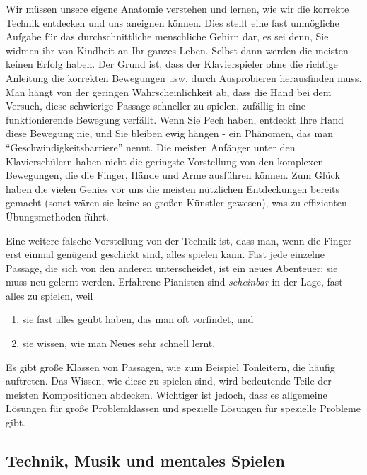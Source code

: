 Wir müssen unsere eigene Anatomie verstehen und lernen, wie wir die korrekte Technik entdecken und uns aneignen können.
Dies stellt eine fast unmögliche Aufgabe für das durchschnittliche menschliche Gehirn dar, es sei denn, Sie widmen ihr von Kindheit an Ihr ganzes Leben.
Selbst dann werden die meisten keinen Erfolg haben.
Der Grund ist, dass der Klavierspieler ohne die richtige Anleitung die korrekten Bewegungen usw. durch Ausprobieren herausfinden muss.
Man hängt von der geringen Wahrscheinlichkeit ab, dass die Hand bei dem Versuch, diese schwierige Passage schneller zu spielen, zufällig in eine funktionierende Bewegung verfällt.
Wenn Sie Pech haben, entdeckt Ihre Hand diese Bewegung nie, und Sie bleiben ewig hängen - ein Phänomen, das man \enquote{Geschwindigkeitsbarriere} nennt.
Die meisten Anfänger unter den Klavierschülern haben nicht die geringste Vorstellung von den komplexen Bewegungen, die die Finger, Hände und Arme ausführen können.
Zum Glück haben die vielen Genies vor uns die meisten nützlichen Entdeckungen bereits gemacht (sonst wären sie keine so großen Künstler gewesen), was zu effizienten Übungsmethoden führt.

Eine weitere falsche Vorstellung von der Technik ist, dass man, wenn die Finger erst einmal genügend geschickt sind, alles spielen kann.
Fast jede einzelne Passage, die sich von den anderen unterscheidet, ist ein neues Abenteuer; sie muss neu gelernt werden.
Erfahrene Pianisten sind \textit{scheinbar} in der Lage, fast alles zu spielen, weil

\begin{enumerate}[label={\arabic*.}] 
\item sie fast alles geübt haben, das man oft vorfindet, und
\item sie wissen, wie man Neues sehr schnell lernt.
 \end{enumerate}
Es gibt große Klassen von Passagen, wie zum Beispiel Tonleitern, die häufig auftreten.
Das Wissen, wie diese zu spielen sind, wird bedeutende Teile der meisten Kompositionen abdecken.
Wichtiger ist jedoch, dass es allgemeine Lösungen für große Problemklassen und spezielle Lösungen für spezielle Probleme gibt.


\subsection{Technik, Musik und mentales Spielen}
\label{c1i3}

